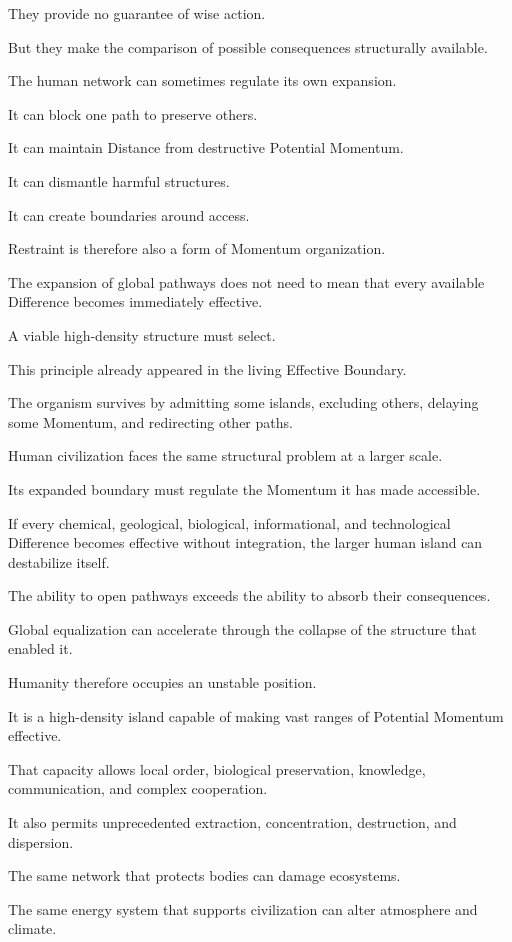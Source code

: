They provide no guarantee of wise action.

But they make the comparison of possible consequences structurally available.

The human network can sometimes regulate its own expansion.

It can block one path to preserve others.

It can maintain Distance from destructive Potential Momentum.

It can dismantle harmful structures.

It can create boundaries around access.

Restraint is therefore also a form of Momentum organization.

The expansion of global pathways does not need to mean that every available Difference becomes immediately effective.

A viable high-density structure must select.

This principle already appeared in the living Effective Boundary.

The organism survives by admitting some islands, excluding others, delaying some Momentum, and redirecting other paths.

Human civilization faces the same structural problem at a larger scale.

Its expanded boundary must regulate the Momentum it has made accessible.

If every chemical, geological, biological, informational, and technological Difference becomes effective without integration, the larger human island can destabilize itself.

The ability to open pathways exceeds the ability to absorb their consequences.

Global equalization can accelerate through the collapse of the structure that enabled it.

Humanity therefore occupies an unstable position.

It is a high-density island capable of making vast ranges of Potential Momentum effective.

That capacity allows local order, biological preservation, knowledge, communication, and complex cooperation.

It also permits unprecedented extraction, concentration, destruction, and dispersion.

The same network that protects bodies can damage ecosystems.

The same energy system that supports civilization can alter atmosphere and climate.

